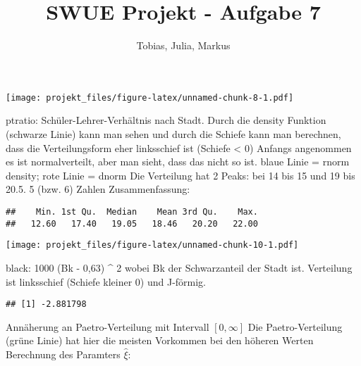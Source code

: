 \documentclass[]{article}
\title{SWUE Projekt - Aufgabe 7}
\author{Tobias, Julia, Markus}
\date{}
\newenvironment{Shaded}{\begin{snugshade}}{\end{snugshade}}
\newcommand{\KeywordTok}[1]{\textcolor[rgb]{0.13,0.29,0.53}{\textbf{#1}}}
\newcommand{\OperatorTok}[1]{\textcolor[rgb]{0.81,0.36,0.00}{\textbf{#1}}}
\newcommand{\NormalTok}[1]{#1}
\begin{document}
\maketitle

\texttt{[image: projekt\_files/figure-latex/unnamed-chunk-8-1.pdf]}

ptratio: Schüler-Lehrer-Verhältnis nach Stadt. Durch die density
Funktion (schwarze Linie) kann man sehen und durch die Schiefe kann man
berechnen, dass die Verteilungsform eher linksschief ist (Schiefe
\textless{} 0) Anfangs angenommen es ist normalverteilt, aber man sieht,
dass das nicht so ist. blaue Linie = rnorm density; rote Linie = dnorm
Die Verteilung hat 2 Peaks: bei 14 bis 15 und 19 bis 20.5. 5 (bzw. 6)
Zahlen Zusammenfassung:

\begin{Shaded}
\end{Shaded}

\begin{verbatim}
##    Min. 1st Qu.  Median    Mean 3rd Qu.    Max. 
##   12.60   17.40   19.05   18.46   20.20   22.00
\end{verbatim}

\texttt{[image: projekt\_files/figure-latex/unnamed-chunk-10-1.pdf]}

black: 1000 (Bk - 0,63) \^{} 2 wobei Bk der Schwarzanteil der Stadt ist.
Verteilung ist linksschief (Schiefe kleiner 0) und J-förmig.

\begin{Shaded}
\end{Shaded}

\begin{verbatim}
## [1] -2.881798
\end{verbatim}

Annäherung an Paetro-Verteilung mit Intervall \([0, \infty]\) Die
Paetro-Verteilung (grüne Linie) hat hier die meisten Vorkommen bei den
höheren Werten Berechnung des Paramters \(\hat \xi\):

\begin{Shaded}
\end{Shaded}
\end{document}
